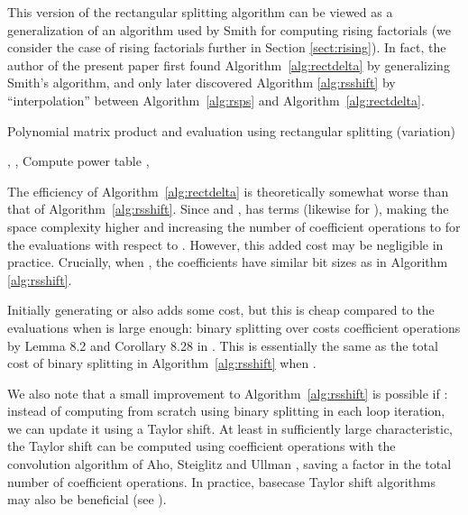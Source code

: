 \documentclass{sig-alternate}
\begin{document}
This version of the rectangular splitting algorithm can be viewed as a generalization of an
algorithm used by Smith \cite{Smith2001} for computing rising factorials (we consider
the case of rising factorials further in Section \ref{sect:rising}).
In fact, the author of the present paper first
found Algorithm~\ref{alg:rectdelta} by generalizing
Smith's algorithm, and only later discovered
Algorithm \ref{alg:rsshift} by ``interpolation'' between
Algorithm~\ref{alg:rsps} and Algorithm~\ref{alg:rectdelta}.

\begin{algorithm}
  \caption{Polynomial matrix product and evaluation using rectangular splitting (variation)}
  \label{alg:rectdelta}
  \begin{algorithmic}[1]
    \Require , , 
    \Ensure 
    \State Compute power table , 
    \State 
    \Statex {}
    \State 
    \Statex {}
    \For{}
      \State 
      \Statex {}
      \State 
    \EndFor
    \State \Return{}
  \end{algorithmic}
\end{algorithm}

The efficiency of Algorithm~\ref{alg:rectdelta} is theoretically
somewhat worse than that of Algorithm~\ref{alg:rsshift}.
Since  and ,
 has  terms (likewise for ),
making the space complexity higher and increasing
the number of coefficient operations to 
for the evaluations with respect to .
However, this added cost may be negligible in practice.
Crucially, when , the coefficients
have similar bit sizes as in Algorithm \ref{alg:rsshift}.

Initially generating  or  also adds some cost,
but this is cheap compared to the evaluations when  is
large enough: binary splitting over 
costs  coefficient operations by
Lemma 8.2 and Corollary 8.28 in \cite{vonzurGathenGerhard2003}.
This is essentially the same as the total cost of binary
splitting in Algorithm~\ref{alg:rsshift} when .

We also note that a small improvement to Algorithm~\ref{alg:rsshift}
is possible if :
instead of computing  from scratch using binary splitting
in each loop iteration, we can update it using a Taylor shift.
At least in sufficiently large characteristic,
the Taylor shift can be computed using  coefficient
operations with the
convolution algorithm of Aho, Steiglitz and Ullman \cite{Aho1975evaluating},
saving a factor  in the total number of coefficient operations.
In practice,
basecase Taylor shift algorithms may also be beneficial (see \cite{von1997fast}).
\end{document}
